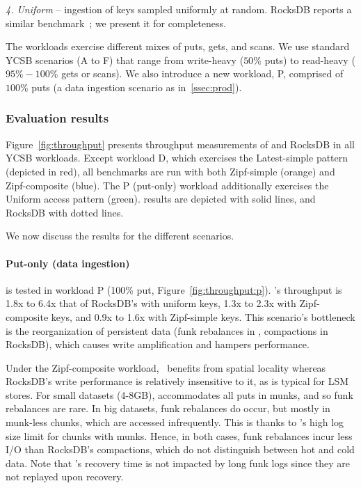 \emph{4. Uniform} -- ingestion of keys sampled uniformly at random. RocksDB
reports a similar benchmark~\cite{rocksdb-benchmarks}; we present it for completeness.

The workloads exercise different mixes of puts, gets, and scans. We use standard YCSB scenarios 
(A to F) that range from write-heavy ($50\%$ puts) to read-heavy ($95\%-100\%$ gets or scans). 
We also introduce a new workload, P, comprised of $100\%$ puts (a data ingestion scenario
as in~\cref{ssec:prod}).

\subsubsection{Evaluation results}
Figure~\ref{fig:throughput} presents throughput measurements of \sys\/ and RocksDB
in all YCSB workloads. Except workload D, which exercises the Latest-simple pattern
(depicted in red), all benchmarks are run with both  Zipf-simple (orange) 
and Zipf-composite (blue). The P (put-only) workload 
additionally exercises the Uniform access pattern (green). \sys\/ results are depicted with solid
lines, and RocksDB with dotted lines. 

We now discuss the results for the different scenarios.
  
\paragraph{ Put-only (data ingestion)} is tested in workload
{P} (100\% put, Figure~\ref{fig:throughput:p}). 
\sys's throughput is 1.8x to 6.4x that of RocksDB's with uniform keys, 1.3x to 2.3x with Zipf-composite keys, 
and 0.9x to 1.6x with Zipf-simple keys. This scenario's bottleneck is the reorganization of persistent data  
(funk rebalances in \sys, compactions in RocksDB), which causes write amplification and hampers performance. 
 
 Under the Zipf-composite workload, \sys\ benefits from spatial locality whereas RocksDB's write performance 
 is relatively insensitive to it, as is typical for LSM stores. For small datasets (4-8GB), \sys\/ accommodates 
all puts in munks, and so funk rebalances are rare. In big datasets, funk rebalances do occur, but mostly in 
munk-less chunks, which are accessed infrequently. This is thanks to \sys\/'s high log size limit for chunks 
with munks. Hence, in both cases, funk rebalances incur less I/O than RocksDB's compactions, 
which do not distinguish between hot and cold data. Note that \sys's recovery time is not impacted by 
long funk logs since they are not replayed upon recovery.

